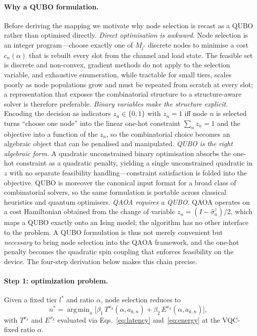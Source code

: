 \documentclass[11pt,a4paper]{article}
\theoremstyle{definition}
\DeclareMathOperator*{\argmin}{arg\,min}
\begin{document}
\paragraph{Why a QUBO formulation.}
Before deriving the mapping we motivate why node selection is recast as a QUBO rather than optimised directly. \emph{Direct optimisation is awkward.} Node selection is an integer program---choose exactly one of $M_{l^*}$ discrete nodes to minimise a cost $c_n(\alpha)$ that is rebuilt every slot from the channel and load state. The feasible set is discrete and non-convex, gradient methods do not apply to the selection variable, and exhaustive enumeration, while tractable for small tiers, scales poorly as node populations grow and must be repeated from scratch at every slot; a representation that exposes the combinatorial structure to a structure-aware solver is therefore preferable. \emph{Binary variables make the structure explicit.} Encoding the decision as indicators $z_n\in\{0,1\}$ with $z_n{=}1$ iff node $n$ is selected turns ``choose one node'' into the linear one-hot constraint $\sum_n z_n=1$ and the objective into a function of the $z_n$, so the combinatorial choice becomes an algebraic object that can be penalised and manipulated. \emph{QUBO is the right algebraic form.} A quadratic unconstrained binary optimisation absorbs the one-hot constraint as a quadratic penalty, yielding a single unconstrained quadratic in $z$ with no separate feasibility handling---constraint satisfaction is folded into the objective. QUBO is moreover the canonical input format for a broad class of combinatorial solvers, so the same formulation is portable across classical heuristics and quantum optimisers. \emph{QAOA requires a QUBO.} QAOA operates on a cost Hamiltonian obtained from the change of variable $z_n=(I-\hat\sigma_n^z)/2$, which maps a QUBO exactly onto an Ising model; the algorithm has no other interface to the problem. A QUBO formulation is thus not merely convenient but \emph{necessary} to bring node selection into the QAOA framework, and the one-hot penalty becomes the quadratic spin coupling that enforces feasibility on the device. The four-step derivation below makes this chain precise.

\paragraph{Step 1: optimization problem.}
Given a fixed tier $l^*$ and ratio $\alpha$, node selection reduces to
\[
  n^* = \argmin_n \big[\beta_1\,T^{x_k}(\alpha, a_{k,n}) + \beta_2\,E^{x_k}(\alpha, a_{k,n})\big],
\]
with $T^{x_k}$ and $E^{x_k}$ evaluated via Eqs.~\eqref{eq:latency} and~\eqref{eq:energy} at the VQC-fixed ratio $\alpha$.
\end{document}
